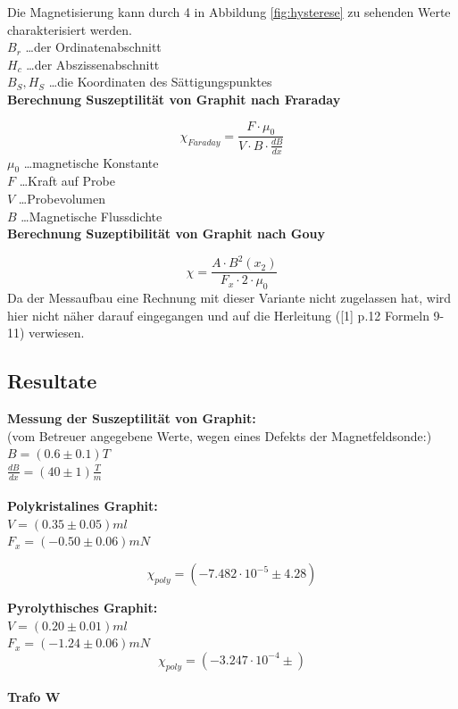 \documentclass[12pt,a4paper]{article}
\begin{document}
\begin{multicols}{2}
\noindent
Die Magnetisierung kann durch 4 in Abbildung \ref{fig:hysterese} zu sehenden Werte charakterisiert werden.\\
$B_r$ \ldots der Ordinatenabschnitt\\
$H_c$ \ldots der Abszissenabschnitt\\
$B_S, H_S$ \ldots die Koordinaten des Sättigungspunktes\\


\textbf{Berechnung Suszeptilität von Graphit nach Fraraday}

$$\chi_{Faraday} = \frac{F \cdot \mu_0}{V \cdot B \cdot \frac{dB}{dx}}$$
$\mu_0$ \ldots magnetische Konstante\\
$F$ \ldots Kraft auf Probe\\
$V$ \ldots Probevolumen\\
$B$ \ldots Magnetische Flussdichte\\

\noindent
\textbf{Berechnung Suzeptibilität von Graphit nach Gouy}

$$\chi = \frac{A \cdot B^2(x_2)}{F_x \cdot 2 \cdot \mu_{0}} $$
Da der Messaufbau eine Rechnung mit dieser Variante nicht zugelassen hat, wird hier nicht näher darauf eingegangen und auf die Herleitung ([1] p.12 Formeln 9-11) verwiesen.

\subsection{Resultate}
\textbf{Messung der Suszeptilität von Graphit:}\\
(vom Betreuer angegebene Werte, wegen eines Defekts der Magnetfeldsonde:)\\
$B = (0.6 \pm 0.1)T$\\
$\frac{dB}{dx} = (40 \pm 1) \frac{T}{m}$\\
\\
\textbf{Polykristalines Graphit:}\\
$V=(0.35 \pm 0.05) ml$\\
$F_x=(-0.50 \pm 0.06)mN$

$$\chi_{poly} = (-7.482 \cdot 10^{-5} \pm 4.28)$$

\textbf{Pyrolythisches Graphit:}\\
$V=(0.20 \pm 0.01) ml$\\
$F_x=(-1.24 \pm 0.06)mN$
$$\chi_{poly} = (-3.247 \cdot 10^{-4} \pm )$$
\\
\noindent
\textbf{Trafo W}\\

\end{multicols}
\end{document}
